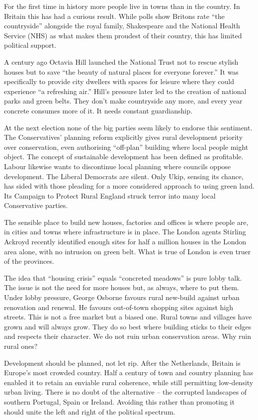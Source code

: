 For the first time in history more people live in towns than in the country. In Britain this has had a curious result. While polls show Britons rate ``the countryside'' alongside the royal family, Shakespeare and the National Health Service (NHS) as what makes them proudest of their country, this has limited political support.


A century ago Octavia Hill launched the National Trust not to rescue stylish houses but to save ``the beauty of natural places for everyone forever.'' It was specifically to provide city dwellers with spaces for leisure where they could experience ``a refreshing air.'' Hill's pressure later led to the creation of national parks and green belts. They don't make countryside any more, and every year concrete consumes more of it. It needs constant guardianship.


At the next election none of the big parties seem likely to endorse this sentiment. The Conservatives' planning reform explicitly gives rural development priority over conservation, even authorising ``off-plan'' building where local people might object. The concept of sustainable development has been defined as profitable. Labour likewise wants to discontinue local planning where councils oppose development. The Liberal Democrats are silent. Only Ukip, sensing its chance, has sided with those pleading for a more considered approach to using green land. Its Campaign to Protect Rural England struck terror into many local Conservative parties.


The sensible place to build new houses, factories and offices is where people are, in cities and towns where infrastructure is in place. The London agents Stirling Ackroyd recently identified enough sites for half a million houses in the London area alone, with no intrusion on green belt. What is true of London is even truer of the provinces.


The idea that ``housing crisis'' equals ``concreted meadows'' is pure lobby talk. The issue is not the need for more houses but, as always, where to put them. Under lobby pressure, George Osborne favours rural new-build against urban renovation and renewal. He favours out-of-town shopping sites against high streets. This is not a free market but a biased one. Rural towns and villages have grown and will always grow. They do so best where building sticks to their edges and respects their character. We do not ruin urban conservation areas. Why ruin rural ones?


Development should be planned, not let rip. After the Netherlands, Britain is Europe's most crowded country. Half a century of town and country planning has enabled it to retain an enviable rural coherence, while still permitting low-density urban living. There is no doubt of the alternative – the corrupted landscapes of southern Portugal, Spain or Ireland. Avoiding this rather than promoting it should unite the left and right of the political spectrum.


